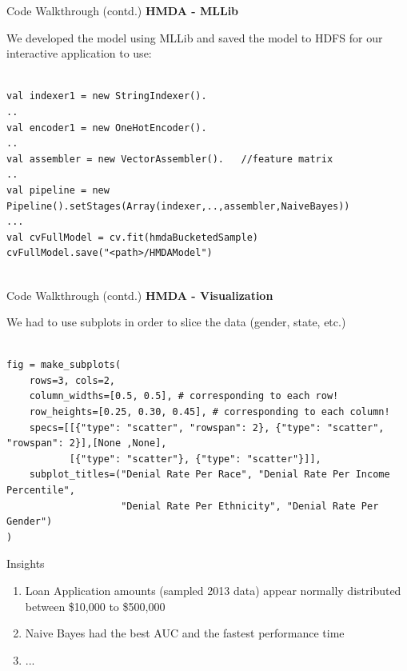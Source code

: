 \documentclass{beamer}
\begin{document}
\begin{frame}[fragile]{Code Walkthrough (contd.)}
\textbf{HMDA - MLLib}

We developed the model using MLLib and saved the model to HDFS for our interactive application to use: 

\begin{lstlisting}

val indexer1 = new StringIndexer().
..
val encoder1 = new OneHotEncoder().
..
val assembler = new VectorAssembler().   //feature matrix
..
val pipeline = new Pipeline().setStages(Array(indexer,..,assembler,NaiveBayes))
...
val cvFullModel = cv.fit(hmdaBucketedSample)
cvFullModel.save("<path>/HMDAModel")


\end{lstlisting}

\end{frame}

\begin{frame}[fragile]{Code Walkthrough (contd.)}
\textbf{HMDA - Visualization}

We had to use subplots in order to slice the data (gender, state, etc.)

\begin{lstlisting}

fig = make_subplots(
    rows=3, cols=2,
    column_widths=[0.5, 0.5], # corresponding to each row!
    row_heights=[0.25, 0.30, 0.45], # corresponding to each column!
    specs=[[{"type": "scatter", "rowspan": 2}, {"type": "scatter", "rowspan": 2}],[None ,None],
           [{"type": "scatter"}, {"type": "scatter"}]],
    subplot_titles=("Denial Rate Per Race", "Denial Rate Per Income Percentile", 
                    "Denial Rate Per Ethnicity", "Denial Rate Per Gender")
)

\end{lstlisting}

\end{frame}


\begin{frame}{Insights}

\begin{enumerate}

\item Loan Application amounts (sampled 2013 data) appear normally distributed between \$10,000 to \$500,000
\item Naive Bayes had the best AUC and the fastest performance time
\item ...

\end{enumerate}

\end{frame}
\end{document}
